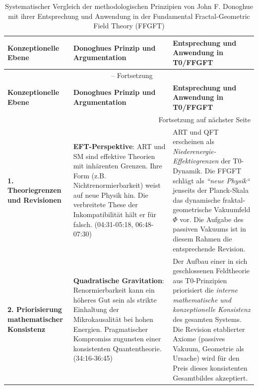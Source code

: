	\begin{longtable}{p{} p{} p{}}
		\caption{Systematischer Vergleich der methodologischen Prinzipien von John F. Donoghue mit ihrer Entsprechung und Anwendung in der Fundamental Fractal-Geometric Field Theory (FFGFT)} \\
		\toprule
		\textbf{Konzeptionelle Ebene} & \textbf{Donoghues Prinzip und Argumentation} & \textbf{Entsprechung und Anwendung in T0/FFGFT} \\
		\midrule
		\endfirsthead
		
		\multicolumn{3}{c}{{\tablename\ \thetable{} -- Fortsetzung}} \\
		\toprule
		\textbf{Konzeptionelle Ebene} & \textbf{Donoghues Prinzip und Argumentation} & \textbf{Entsprechung und Anwendung in T0/FFGFT} \\
		\midrule
		\endhead
		
		\midrule \multicolumn{3}{r}{{Fortsetzung auf nächster Seite}} \\
		\endfoot
		
		\bottomrule
		\endlastfoot
		\textbf{1. Theoriegrenzen und Revisionen} & 
		\textbf{EFT-Perspektive}: ART und SM sind effektive Theorien mit inhärenten Grenzen. Ihre Form (z.B. Nichtrenormierbarkeit) weist auf neue Physik hin. Die verbreitete These der Inkompatibilität hält er für falsch. \cite{DonoghueInterview2025} (04:31-05:18, 06:48-07:30) & 
		ART und QFT erscheinen als \emph{Niederenergie-Effektivgrenzen} der T0-Dynamik. Die FFGFT schlägt als \emph{``neue Physik``} jenseits der Planck-Skala das dynamische fraktal-geometrische Vakuumfeld $\Phi$ vor. Die Aufgabe des passiven Vakuums ist in diesem Rahmen die entsprechende Revision. \\
		\midrule
		
		\textbf{2. Priorisierung mathematischer Konsistenz} & 
		\textbf{Quadratische Gravitation}: Renormierbarkeit kann ein höheres Gut sein als strikte Einhaltung der Mikrokausalität bei hohen Energien. Pragmatischer Kompromiss zugunsten einer konsistenten Quantentheorie. \cite{DonoghueInterview2025} (34:16-36:45) & 
		Der Aufbau einer in sich geschlossenen Feldtheorie aus T0-Prinzipien priorisiert die \emph{interne mathematische und konzeptionelle Konsistenz} des gesamten Systems. Die Revision etablierter Axiome (passives Vakuum, Geometrie als Ursache) wird für den Preis dieses konsistenten Gesamtbildes akzeptiert. \\
		\midrule
		

\end{longtable}
